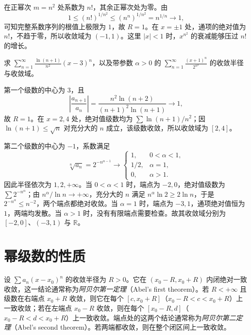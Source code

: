 \begin{solve}
在正幂次 $m=n^2$ 处系数为 $n!$，其余正幂次处为零。由
\[
    1\leq(n!)^{1/n^2}\leq(n^n)^{1/n^2}
    =n^{1/n}\longrightarrow1,
\]
可知完整系数序列的根值上极限为 $1$，故 $R=1$。在 $x=\pm1$ 处，通项的绝对值为 $n!$，不趋于零，所以收敛域为 $(-1,1)$。这里 $|x|<1$ 时，$x^{n^2}$ 的衰减能够压过 $n!$ 的增长。
\end{solve}

\begin{example}
\label{ex:shifted-and-parameter-power-series}
求 $\displaystyle\sum_{n=1}^\infty\frac{\ln(n+1)}{n^2}(x-3)^n$，以及带参数 $\alpha>0$ 的 $\displaystyle\sum_{n=1}^\infty\frac{(x+1)^n}{2^{n^\alpha}}$ 的收敛半径与收敛域。
\end{example}

\begin{solve}
第一个级数的中心为 $3$，且
\[
    \left|\frac{a_{n+1}}{a_n}\right|
    =\frac{n^2\ln(n+2)}{(n+1)^2\ln(n+1)}\longrightarrow1,
\]
故 $R=1$。在 $x=2,4$ 处，绝对值级数均为 $\sum\ln(n+1)/n^2$；因 $\ln(n+1)\leq\sqrt n$ 对充分大的 $n$ 成立，该级数收敛，所以收敛域为 $[2,4]$。

第二个级数的中心为 $-1$，系数满足
\[
    \sqrt[n]{a_n}=2^{-n^{\alpha-1}}
    \longrightarrow
    \begin{cases}
        1,&0<\alpha<1,\\
        1/2,&\alpha=1,\\
        0,&\alpha>1.
    \end{cases}
\]
因此半径依次为 $1,2,+\infty$。当 $0<\alpha<1$ 时，端点为 $-2,0$，绝对值级数为 $\sum2^{-n^\alpha}$；由 $n^\alpha/\ln n\to+\infty$，充分大的 $n$ 满足 $n^\alpha\ln2\geq2\ln n$，于是 $2^{-n^\alpha}\leq n^{-2}$，两个端点都绝对收敛。当 $\alpha=1$ 时，端点为 $-3,1$，通项绝对值恒为 $1$，两端均发散。当 $\alpha>1$ 时，没有有限端点需要检查。故其收敛域分别为 $[-2,0]$、$(-3,1)$ 与 $\mathbb R$。
\end{solve}

\section{幂级数的性质}
\label{sec:properties-of-power-series}

\begin{theorem}[阿贝尔定理]
\label{thm:abel-power-series-uniform-convergence}
设 $\sum a_n(x-x_0)^n$ 的收敛半径为 $R>0$。它在 $(x_0-R,x_0+R)$ 内闭绝对一致收敛，这一结论通常称为\emph{阿贝尔第一定理}（Abel's first theorem）。若 $R<+\infty$ 且级数在右端点 $x_0+R$ 收敛，则它在每个 $[c,x_0+R]$（$x_0-R<c<x_0+R$）上一致收敛；若在左端点 $x_0-R$ 收敛，则在每个 $[x_0-R,d]$（$x_0-R<d<x_0+R$）上一致收敛。端点处的这两个结论通常称为\emph{阿贝尔第二定理}（Abel's second theorem）。若两端都收敛，则在整个闭区间上一致收敛。
\end{theorem}


